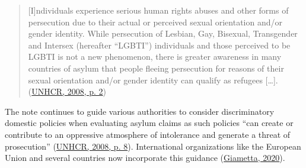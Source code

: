 \documentclass[
  11pt,
]{article}
\begin{document}
\begin{quote}
{[}I{]}ndividuals experience serious human rights abuses and other forms of persecution due to their actual or perceived sexual orientation and/or gender identity. While persecution of Lesbian, Gay, Bisexual, Transgender and Intersex (hereafter ``LGBTI'') individuals and those perceived to be LGBTI is not a new phenomenon, there is greater awareness in many countries of asylum that people fleeing persecution for reasons of their sexual orientation and/or gender identity can qualify as refugees {[}\ldots{]}. (\protect\hyperlink{ref-unhcr_2008}{UNHCR, 2008, p. 2})
\end{quote}

The note continues to guide various authorities to consider discriminatory domestic policies when evaluating asylum claims as such policies ``can create or contribute to an oppressive atmosphere of intolerance and generate a threat of prosecution'' (\protect\hyperlink{ref-unhcr_2008}{UNHCR, 2008, p. 8}). International organizations like the European Union and several countries now incorporate this guidance (\protect\hyperlink{ref-giametta_2020}{Giametta, 2020}).
\end{document}
